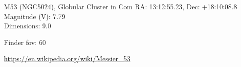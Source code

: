 \begin{block}{M53 (NGC5024), Globular Cluster in Com}
    RA: 13:12:55.23, Dec: +18:10:08.8 \\ 
    Magnitude (V): 7.79 \\ 
    Dimensions: 9.0 

    Finder fov: 60 

    \url{https://en.wikipedia.org/wiki/Messier_53} 
\end{block}